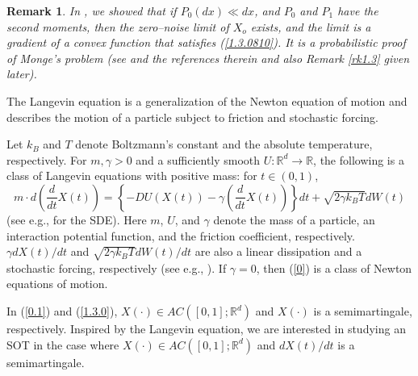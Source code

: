 \documentclass[12pt]{article}
\newtheorem{remark}{Remark}[section]
\begin{document}
\begin{remark}\label{rk1.1.0}
In \cite{M04}, we showed that if $P_0(dx)\ll dx$, and $P_0$ and $P_1$ have the second moments, then 
the zero--noise limit of $X_o$ exists, and the limit is a gradient of a convex function that satisfies 
(\ref{1.3.0810}).
It is a probabilistic proof of Monge's problem
(see \cite{Bre1,Bre2,L2,M09,M2021,1-MTsiam,1-PC,1-RR,1-V2} and the references therein
and also Remark \ref{rk1.3} given later).

\end{remark}








The Langevin equation is a generalization of the Newton equation of motion and describes the motion of a particle subject to friction and stochastic forcing.

Let  $k_B$ and $T$ denote Boltzmann's constant and the absolute temperature, respectively.
For $m, \gamma >0$ and a sufficiently smooth $U:\mathbb{R}^d\rightarrow\mathbb{R}$,
the following is a class of Langevin equations with positive mass: for $t\in (0,1)$,
\begin{equation}\label{0}
m\cdot d\left(\frac{d}{dt}X(t)\right)=\left\{-DU(X(t))-\gamma \left(\frac{d}{dt}X(t)\right)\right\}dt+\sqrt{2\gamma k_BT}dW(t)
\end{equation}
(see e.g., \cite{IW14} for the SDE).
Here $m$, $U$, and $\gamma$ denote 
the mass of a particle, an interaction potential function, and
the friction coefficient, respectively.
$\gamma dX(t)/dt$ and $\sqrt{2\gamma k_BT}dW(t)/dt$ are also 
a linear dissipation and a stochastic forcing, respectively
(see e.g., \cite{PAV}).
If $\gamma=0$, then (\ref{0}) is a class of Newton equations of motion.

In (\ref{0.1}) and (\ref{1.3.0}), $X(\cdot)\in AC([0,1];\mathbb{R}^d)$ and 
$X(\cdot)$ is a semimartingale, respectively.
Inspired by the Langevin equation, we are interested in studying  an SOT in the case where 
$X(\cdot)\in AC([0,1];\mathbb{R}^d)$ and  %
 $dX(t)/dt$ is a semimartingale.
 
\end{document}
